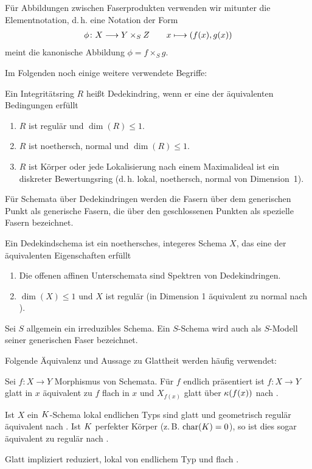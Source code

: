 Für Abbildungen zwischen Faserprodukten verwenden wir mitunter die
Elementnotation, d.\,h. eine Notation der Form
\begin{gather*}
  \phi\colon X\longrightarrow Y\times_S Z\qquad
  x\longmapsto (f(x),g(x))
\end{gather*}
meint die kanonische Abbildung $\phi=f\times_S g$.

Im Folgenden noch einige weitere verwendete Begriffe:
\begin{Definition}[Dedekindring]\label{def:dedekindring}
  Ein Integritätsring $R$ heißt Dedekindring, wenn er eine der
  äquivalenten Bedingungen erfüllt
  \begin{enumerate}[label=(\roman*)]
  \item $R$ ist regulär und $\dim(R)\leq 1$.
  \item $R$ ist noethersch, normal und $\dim(R)\leq 1$.
  \item $R$ ist Körper oder
    jede Lokalisierung nach einem Maximalideal ist ein diskreter
    Bewertungsring
    (d.\,h. lokal, noethersch, normal von Dimension~1).
  \end{enumerate}
\end{Definition}
Für Schemata über Dedekindringen werden die Fasern über dem
generischen Punkt als generische Fasern, die über den geschlossenen
Punkten als spezielle Fasern bezeichnet.
\begin{Definition}[Dedekindschema]
  Ein Dedekindschema ist ein noethersches, integeres Schema $X$, das
  eine der äquivalenten Eigenschaften erfüllt
  \begin{enumerate}[label=(\roman*)]
  \item Die offenen affinen Unterschemata sind Spektren von Dedekindringen.
  \item $\dim(X)\leq 1$ und $X$ ist regulär
    (in Dimension 1 äquivalent zu normal nach
    \cite[Corollary 6.39, Proposition 6.40]{wedhorn}).
  \end{enumerate}
\end{Definition}
Sei $S$ allgemein ein irreduzibles Schema. Ein $S$-Schema wird auch als
$S$-Modell seiner generischen Faser bezeichnet.

Folgende Äquivalenz und Aussage zu Glattheit werden häufig verwendet:
\begin{Bemerkung}\label{thm:eigglatt}
  Sei $f\colon X\to Y$ Morphismus von Schemata.
  Für $f$ endlich präsentiert ist $f\colon X\to Y $ glatt in $x$
  äquivalent zu $f$ flach in $x$ und $X_{f(x)}$ glatt über $\kappa(f(x))$ nach
  \cite[8.5, Proposition 17]{bosch}.
  
  Ist $X$ ein $K$-Schema lokal endlichen Typs sind glatt und
  geometrisch regulär äquivalent nach \cite[Corollary 6.32]{wedhorn}.
  Ist $K$ perfekter Körper (z.\,B. $\operatorname{char}(K)=0$), so ist dies sogar
  äquivalent zu regulär nach \cite[Remark 6.33]{wedhorn}.
    
  Glatt impliziert reduziert, lokal von endlichem Typ und flach
  \cite[für flach s.][Theorem 14.22]{wedhorn}.
\end{Bemerkung}

